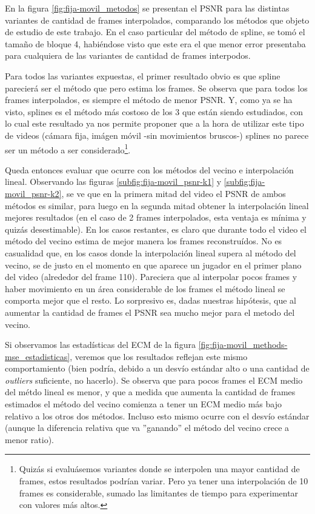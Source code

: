 \par En la figura \ref{fig:fija-movil_metodos} se presentan el PSNR para las
distintas variantes de cantidad de frames interpolados, comparando los m\'etodos
que objeto de estudio de este trabajo. En el caso particular del m\'etodo de
spline, se tom\'o el tama\~no de bloque 4, habi\'endose visto que este era el
que menor error presentaba para cualquiera de las variantes de cantidad de frames
interpodos.

\par Para todos las variantes expuestas, el primer resultado obvio es que
spline parecier\'a ser el m\'etodo que pero estima los frames. Se observa que
para todos los frames interpolados, es siempre el m\'etodo de menor PSNR. Y,
como ya se ha visto, splines es el m\'etodo m\'as costoso de los 3 que est\'an
siendo estudiados, con lo cual este resultado ya nos permite proponer que a la
hora de utilizar este tipo de videos (c\'amara fija, im\'agen m\'ovil -sin
movimientos bruscos-) splines no parece ser un m\'etodo a ser
considerado\footnote{Quiz\'as si evalu\'asemos variantes donde se interpolen
una mayor cantidad de frames, estos resultados podr\'ian variar. Pero ya tener
una interpolaci\'on de 10 frames es considerable, sumado las limitantes de
tiempo para experimentar con valores m\'as altos.}.

\par Queda entonces evaluar que ocurre con los m\'etodos del vecino e
interpolaci\'on lineal. Observando las figuras \ref{subfig:fija-movil_psnr-k1}
y \ref{subfig:fija-movil_psnr-k2}, se ve que en la primera mitad del video el
PSNR de ambos m\'etodos es similar, para luego en la segunda mitad obtener la
interpolaci\'on lineal mejores resultados (en el caso de 2 frames interpolados,
esta ventaja es m\'inima y quiz\'as desestimable). En los casos restantes, es
claro que durante todo el video el m\'etodo del vecino estima de mejor manera
los frames reconstru\'idos. No es casualidad que, en los casos donde la
interpolaci\'on lineal supera al m\'etodo del vecino, se de justo en el momento
en que aparece un jugador en el primer plano del video (alrededor del frame
110). Pareciera que al interpolar pocos frames y haber movimiento en un \'area
considerable de los frames el m\'etodo lineal se comporta mejor que el resto.
Lo sorpresivo es, dadas nuestras hip\'otesis, que al aumentar la cantidad de
frames el PSNR sea mucho mejor para el metodo del vecino.

\par Si observamos las estad\'isticas del ECM de la figura 
\ref{fig:fija-movil_methods-mse_estadisticas}, veremos que los resultados
reflejan este mismo comportamiento (bien podr\'ia, debido a un desv\'io est\'andar
alto o una cantidad de \emph{outliers} suficiente, no hacerlo). Se observa que
para pocos frames el ECM medio del m\'etdo lineal es menor, y que a medida que
aumenta la cantidad de frames estimados el m\'etodo del vecino comienza a tener
un ECM medio m\'as bajo relativo a los otros dos m\'etodos. Incluso esto mismo
ocurre con el desv\'io est\'andar (aunque la diferencia relativa que va ''ganando''
el m\'etodo del vecino crece a menor ratio).

